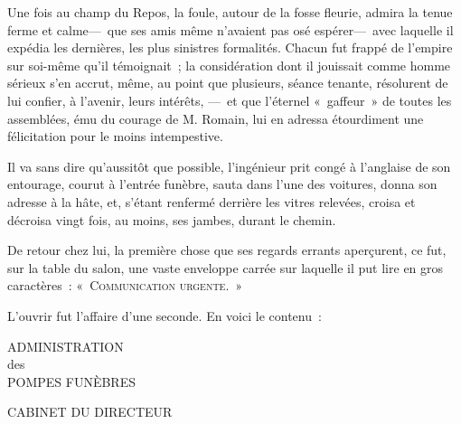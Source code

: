 \documentclass[french,twoside]{book} %
\begin{document}
Une fois au champ du Repos, la foule, autour de la fosse fleurie, admira la tenue ferme et calme— que ses amis même n’avaient pas osé espérer— avec laquelle il expédia les dernières, les plus sinistres formalités. Chacun fut frappé de l’empire sur soi-même qu’il témoignait ; la considération dont il jouissait comme homme sérieux s’en accrut, même, au point que plusieurs, séance tenante, résolurent de lui confier, à l’avenir, leurs intérêts, — et que l’éternel « gaffeur » de toutes les assemblées, ému du courage de M. Romain, lui en adressa étourdiment une félicitation pour le moins intempestive.\par
Il va sans dire qu’aussitôt que possible, l’ingénieur prit congé à l’anglaise de son entourage, courut à l’entrée funèbre, sauta dans l’une des voitures, donna son adresse à la hâte, et, s’étant renfermé derrière les vitres relevées,   croisa et décroisa vingt fois, au moins, ses jambes, durant le chemin.\par
De retour chez lui, la première chose que ses regards errants aperçurent, ce fut, sur la table du salon, une vaste enveloppe carrée sur laquelle il put lire en gros caractères : « {\scshape Communication urgente}. »\par
L’ouvrir fut l’affaire d’une seconde. En voici le contenu :\par

\begin{center}
\noindent \centerline{ADMINISTRATION \\
des \\
POMPES FUNÈBRES}\par
\end{center}

\bigbreak

\begin{center}
\noindent \centerline{CABINET DU DIRECTEUR}\par
\end{center}
\end{document}
